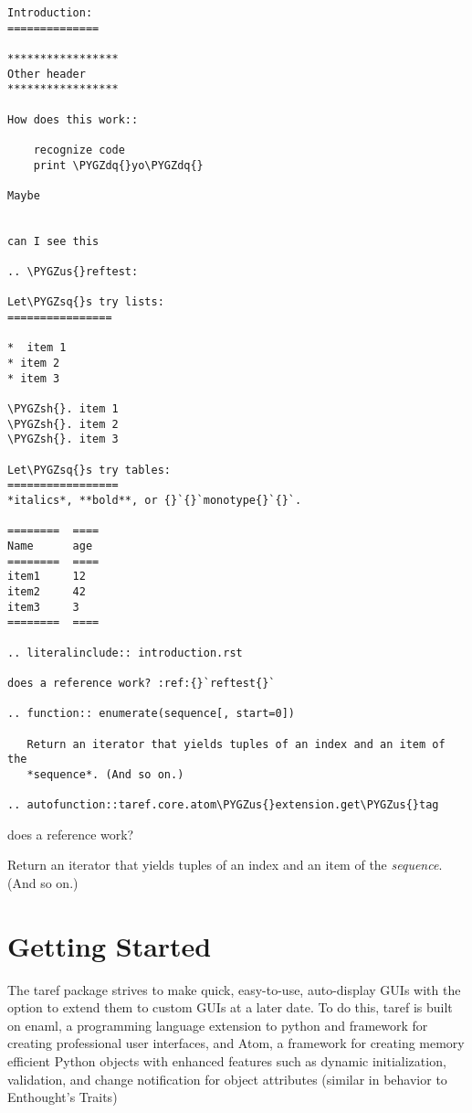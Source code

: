 \documentclass[letterpaper,10pt,english]{sphinxmanual}
\def\PYGZus{\char`\_}
\def\PYGZsh{\char`\#}
\def\PYGZsq{\char`\'}
\def\PYGZdq{\char`\"}
\renewcommand\PYGZsq{\textquotesingle}
\begin{document}
\begin{Verbatim}[commandchars=\\\{\}]
Introduction:
==============

*****************
Other header
*****************

How does this work::

    recognize code
    print \PYGZdq{}yo\PYGZdq{}

Maybe


can I see this

.. \PYGZus{}reftest:

Let\PYGZsq{}s try lists:
================

*  item 1
* item 2
* item 3

\PYGZsh{}. item 1
\PYGZsh{}. item 2
\PYGZsh{}. item 3

Let\PYGZsq{}s try tables:
=================
*italics*, **bold**, or {}`{}`monotype{}`{}`.

========  ====
Name      age
========  ====
item1     12
item2     42
item3     3
========  ====

.. literalinclude:: introduction.rst

does a reference work? :ref:{}`reftest{}`

.. function:: enumerate(sequence[, start=0])

   Return an iterator that yields tuples of an index and an item of the
   *sequence*. (And so on.)

.. autofunction::taref.core.atom\PYGZus{}extension.get\PYGZus{}tag
\end{Verbatim}

does a reference work? {\hyperref[introduction:reftest]{\emph{}}}

\begin{fulllineitems}
\label{introduction:enumerate}
Return an iterator that yields tuples of an index and an item of the
\emph{sequence}. (And so on.)

\end{fulllineitems}



\chapter{Getting Started}
\label{getting_started:getting-started}\label{getting_started::doc}
The taref package strives to make quick, easy-to-use, auto-display GUIs
with the option to extend them to custom GUIs at a later date. To do this,
taref is built on enaml, a programming language extension to python and framework
for creating professional user interfaces, and Atom, a framework for
creating memory efficient Python objects with enhanced features
such as dynamic initialization, validation, and
change notification for object attributes (similar in behavior to Enthought's Traits)
\end{document}
